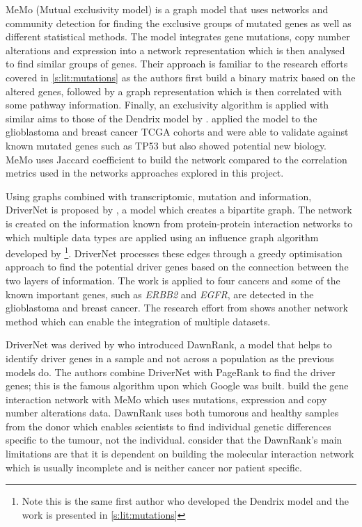 MeMo (Mutual exclusivity model)\cite{Ciriello2012-hi} is a graph model that uses networks and community detection for finding the exclusive groups of mutated genes as well as different statistical methods. The model integrates gene mutations, copy number alterations and expression into a network representation which is then analysed to find similar groups of genes. Their approach is familiar to the research efforts covered in \cref{s:lit:mutations} as the authors first build a binary matrix based on the altered genes, followed by a graph representation which is then correlated with some pathway information. Finally, an exclusivity algorithm is applied with similar aims to those of the Dendrix model by \citet{Vandin2012-cf}. \citet{Ciriello2012-hi} applied the model to the glioblastoma and breast cancer TCGA cohorts and were able to validate against known mutated genes such as TP53 but also showed potential new biology. MeMo uses Jaccard coefficient to build the network compared to the correlation metrics used in the networks approaches explored in this project. 

Using graphs combined with transcriptomic, mutation and information, DriverNet is proposed by \citet{Bashashati2012-lk}, a model which creates a bipartite graph. The network is created on the information known from protein-protein interaction networks to which multiple data types are applied using an influence graph algorithm developed by \citet{Vandin2011-bs}\footnote{Note this is the same first author who developed the Dendrix model and the work is presented in \cref{s:lit:mutations}}. DriverNet processes these edges through a greedy optimisation approach to find the potential driver genes based on the connection between the two layers of information. The work is applied to four cancers and some of the known important genes, such as \textit{ERBB2} and \textit{EGFR}, are detected in the glioblastoma and breast cancer. The research effort from \citet{Bashashati2012-lk} shows another network method which can enable the integration of multiple datasets.

DriverNet was derived by \citet{Hou2014-se} who introduced DawnRank, a model that helps to identify driver genes in a sample and not across a population as the previous models do. The authors combine DriverNet with PageRank to find the driver genes; this is the famous algorithm upon which Google was built. \citet{Hou2014-se} build the gene interaction network with MeMo \cite{Ciriello2012-hi} which uses mutations, expression and copy number alterations data. DawnRank uses both tumorous and healthy samples from the donor which enables scientists to find individual genetic differences specific to the tumour, not the individual. \citet{Hou2014-se} consider that the DawnRank's main limitations are that it is dependent on building the molecular interaction network which is usually incomplete and is neither cancer nor patient specific. 


